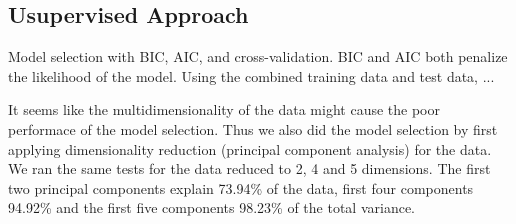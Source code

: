 \subsection{Usupervised Approach}
Model selection with BIC, AIC, and cross-validation. BIC and AIC both penalize the likelihood of the model. Using the combined training data and test data, ...

It seems like the multidimensionality of the data might cause the poor performace of the model selection. Thus we also did the model selection by first applying dimensionality reduction (principal component analysis) for the data. We ran the same tests for the data reduced to 2, 4 and 5 dimensions. The first two principal components explain 73.94\% of the data, first four components 94.92\% and the first five components 98.23\% of the total variance.



